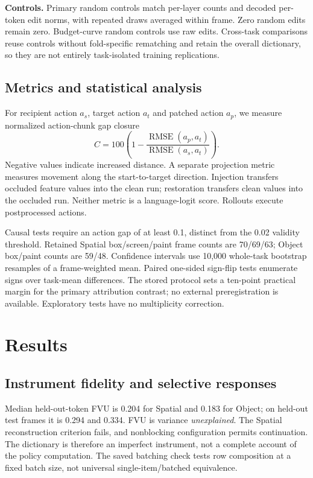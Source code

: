 \documentclass{article}
\begin{document}
\textbf{Controls.} Primary random controls match per-layer counts and decoded per-token edit norms, with repeated draws averaged within frame. Zero random edits remain zero. Budget-curve random controls use raw edits. Cross-task comparisons reuse controls without fold-specific rematching and retain the overall dictionary, so they are not entirely task-isolated training replications.

\subsection{Metrics and statistical analysis}
For recipient action $a_s$, target action $a_t$ and patched action $a_p$, we measure normalized action-chunk gap closure
\begin{equation}
C=100\left(1-\frac{\operatorname{RMSE}(a_p,a_t)}{\operatorname{RMSE}(a_s,a_t)}\right).
\label{eq:closure}
\end{equation}
Negative values indicate increased distance. A separate projection metric measures movement along the start-to-target direction. Injection transfers occluded feature values into the clean run; restoration transfers clean values into the occluded run. Neither metric is a language-logit score. Rollouts execute postprocessed actions.

Causal tests require an action gap of at least 0.1, distinct from the 0.02 validity threshold. Retained Spatial box/screen/paint frame counts are 70/69/63; Object box/paint counts are 59/48. Confidence intervals use 10,000 whole-task bootstrap resamples of a frame-weighted mean. Paired one-sided sign-flip tests enumerate signs over task-mean differences. The stored protocol sets a ten-point practical margin for the primary attribution contrast; no external preregistration is available. Exploratory tests have no multiplicity correction.

\section{Results}
\subsection{Instrument fidelity and selective responses}
Median held-out-token FVU is 0.204 for Spatial and 0.183 for Object; on held-out test frames it is 0.294 and 0.334. FVU is variance \emph{unexplained}. The Spatial reconstruction criterion fails, and nonblocking configuration permits continuation. The dictionary is therefore an imperfect instrument, not a complete account of the policy computation. The saved batching check tests row composition at a fixed batch size, not universal single-item/batched equivalence.
\end{document}
